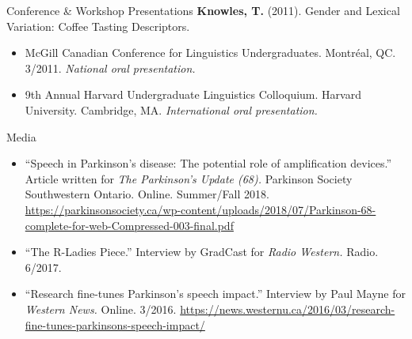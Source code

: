 \documentclass{resume} %
\begin{document}
\begin{rSection}{Conference \& Workshop Presentations}
	{\bf Knowles, T.} (2011). Gender and Lexical Variation: Coffee Tasting Descriptors. 
	\begin{itemize}
				\renewcommand\labelitemi{$\cdot$}
		\item McGill Canadian Conference for Linguistics Undergraduates. Montr\'eal, QC. 3/2011. \emph{National oral presentation.}
		\item 9th Annual Harvard Undergraduate Linguistics Colloquium. Harvard University. Cambridge, MA. \emph{International oral presentation.}
	\end{itemize}

\end{rSection}


\begin{rSection}{Media}
\begin{itemize}
	\renewcommand\labelitemi{$\cdot$}
	\item ``Speech in Parkinson's disease: The potential role of amplification devices.'' Article written for \textit{The Parkinson's Update (68).} Parkinson Society Southwestern Ontario. Online. Summer/Fall 2018. \url{https://parkinsonsociety.ca/wp-content/uploads/2018/07/Parkinson-68-complete-for-web-Compressed-003-final.pdf}
	\item``The R-Ladies Piece.'' Interview by GradCast for \textit{Radio Western.} Radio. 6/2017.
	\item ``Research fine-tunes Parkinson's speech impact.'' Interview by Paul Mayne for \textit{Western News.} Online. 3/2016. \url{https://news.westernu.ca/2016/03/research-fine-tunes-parkinsons-speech-impact/}
\end{itemize}
\end{rSection}

\newpage

\end{document}
